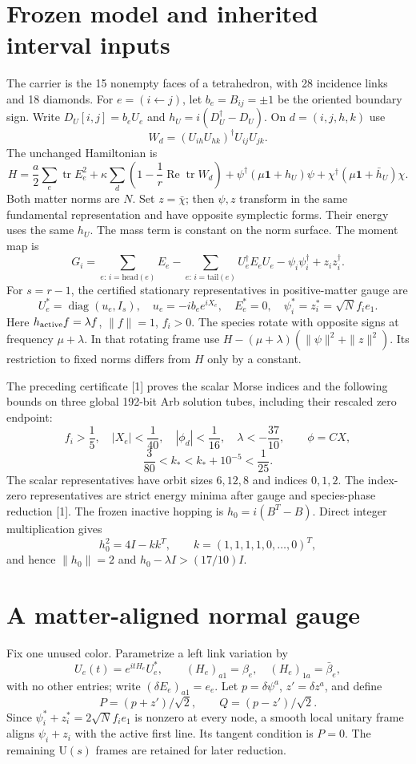 \documentclass[11pt,a4paper]{article}
\newcommand{\tr}{\operatorname{tr}}\newcommand{\diag}{\operatorname{diag}}\newcommand{\Rea}{\operatorname{Re}}\newcommand{\id}{\mathbf1}
\begin{document}
\section{Frozen model and inherited interval inputs}
The carrier is the 15 nonempty faces of a tetrahedron, with 28 incidence links and 18 diamonds. For $e=(i\leftarrow j)$, let $b_e=B_{ij}=\pm1$ be the oriented boundary sign. Write $D_U[i,j]=b_eU_e$ and $h_U=i(D_U^\dagger-D_U)$. On $d=(i,j,h,k)$ use
\[
W_d=(U_{ih}U_{hk})^\dagger U_{ij}U_{jk}.
\]
The unchanged Hamiltonian is
\[
H=\frac a2\sum_e\tr E_e^2+\kappa\sum_d\left(1-\frac1r\Rea\tr W_d\right)
+\psi^\dagger(\mu\id+h_U)\psi+\chi^\dagger(\mu\id+\bar h_U)\chi.
\]
Both matter norms are $N$. Set $z=\bar\chi$; then $\psi,z$ transform in the same fundamental representation and have opposite symplectic forms. Their energy uses the same $h_U$. The mass term is constant on the norm surface. The moment map is
\[
G_i=\sum_{e:\,i=\mathrm{head}(e)}E_e-
\sum_{e:\,i=\mathrm{tail}(e)}U_e^\dagger E_eU_e
-\psi_i\psi_i^\dagger+z_iz_i^\dagger.
\]
For $s=r-1$, the certified stationary representatives in positive-matter gauge are
\[
U_e^*=\diag(u_e,I_s),\quad u_e=-ib_e e^{iX_e},\quad E_e^*=0,
\quad\psi_i^*=z_i^*=\sqrt N f_i e_1.
\]
Here $h_{\rm active}f=\lambda f$, $\|f\|=1$, $f_i>0$. The species rotate with opposite signs at frequency $\mu+\lambda$. In that rotating frame use $H-(\mu+\lambda)(\|\psi\|^2+\|z\|^2)$. Its restriction to fixed norms differs from $H$ only by a constant.

The preceding certificate [1] proves the scalar Morse indices and the following bounds on three global 192-bit Arb solution tubes, including their rescaled zero endpoint:
\[
f_i>\frac15,\quad |X_e|<\frac1{40},\quad |\phi_d|<\frac1{16},\quad
\lambda<-\frac{37}{10},\qquad \phi=CX,
\]
\[
\frac3{80}<k_*<k_*+10^{-5}<\frac1{25}.
\]
The scalar representatives have orbit sizes $6,12,8$ and indices $0,1,2$. The index-zero representatives are strict energy minima after gauge and species-phase reduction [1]. The frozen inactive hopping is $h_0=i(B^T-B)$. Direct integer multiplication gives
\[
h_0^2=4I-kk^T,\qquad k=(1,1,1,1,0,\ldots,0)^T,
\]
and hence $\|h_0\|=2$ and $h_0-\lambda I>(17/10)I$.
\newpage
\section{A matter-aligned normal gauge}
Fix one unused color. Parametrize a left link variation by
\[
U_e(t)=e^{itH_e}U_e^*,\qquad (H_e)_{a1}=\beta_e,
\quad(H_e)_{1a}=\bar\beta_e,
\]
with no other entries; write $(\delta E_e)_{a1}=e_e$. Let $p=\delta\psi^a$, $z'=\delta z^a$, and define
\[
P=(p+z')/\sqrt2,\qquad Q=(p-z')/\sqrt2.
\]
Since $\psi_i^*+z_i^*=2\sqrt N f_i e_1$ is nonzero at every node, a smooth local unitary frame aligns $\psi_i+z_i$ with the active first line. Its tangent condition is $P=0$. The remaining $\mathrm U(s)$ frames are retained for later reduction.
\end{document}
